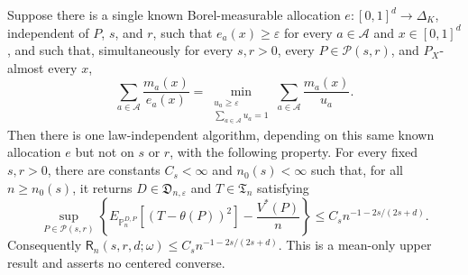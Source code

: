 Suppose there is a single known Borel-measurable allocation \(e:[0,1]^d\to\Delta_K\), independent of \(P\), \(s\), and \(r\), such that \(e_a(x)\geq\varepsilon\) for every \(a\in\mathcal A\) and \(x\in[0,1]^d\), and such that, simultaneously for every \(s,r>0\), every \(P\in\mathcal P(s,r)\), and \(P_X\)-almost every \(x\),
\[
\sum_{a\in\mathcal A}\frac{m_a(x)}{e_a(x)}
=\min_{\substack{u_a\geq\varepsilon\\ \sum_{a\in\mathcal A}u_a=1}}
\sum_{a\in\mathcal A}\frac{m_a(x)}{u_a}.
\tag{43}
\]
Then there is one law-independent algorithm, depending on this same known allocation \(e\) but not on \(s\) or \(r\), with the following property. For every fixed \(s,r>0\), there are constants \(C_s<\infty\) and \(n_0(s)<\infty\) such that, for all \(n\geq n_0(s)\), it returns \(D\in\mathfrak D_{n,\varepsilon}\) and \(T\in\mathfrak T_n\) satisfying
\[
\sup_{P\in\mathcal P(s,r)}
\left\{
E_{\mathbb P_n^{D,P}}[(T-\theta(P))^2]-\frac{V^*(P)}n
\right\}
\leq C_s n^{-1-2s/(2s+d)}.
\tag{44}
\]
Consequently \(\mathsf R_n(s,r,d;\omega)\leq C_s n^{-1-2s/(2s+d)}\). This is a mean-only upper result and asserts no centered converse.